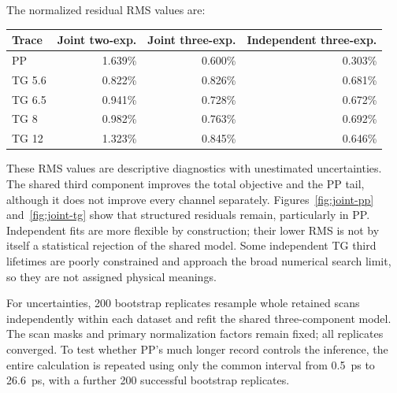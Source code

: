 The normalized residual RMS values are:
\begin{center}
\begin{tabular}{lrrr}
\toprule
Trace & Joint two-exp. & Joint three-exp. & Independent three-exp.\\
\midrule
PP & 1.639\% & 0.600\% & 0.303\%\\
TG 5.6 & 0.822\% & 0.826\% & 0.681\%\\
TG 6.5 & 0.941\% & 0.728\% & 0.672\%\\
TG 8 & 0.982\% & 0.763\% & 0.692\%\\
TG 12 & 1.323\% & 0.845\% & 0.646\%\\
\bottomrule
\end{tabular}
\end{center}
These RMS values are descriptive diagnostics with unestimated uncertainties. The shared third component improves the total objective and the PP tail, although it does not improve every channel separately. Figures~\ref{fig:joint-pp} and~\ref{fig:joint-tg} show that structured residuals remain, particularly in PP. Independent fits are more flexible by construction; their lower RMS is not by itself a statistical rejection of the shared model. Some independent TG third lifetimes are poorly constrained and approach the broad numerical search limit, so they are not assigned physical meanings.

For uncertainties, 200 bootstrap replicates resample whole retained scans independently within each dataset and refit the shared three-component model. The scan masks and primary normalization factors remain fixed; all replicates converged. To test whether PP's much longer record controls the inference, the entire calculation is repeated using only the common interval from \SI{0.5}{ps} to \SI{26.6}{ps}, with a further 200 successful bootstrap replicates.

